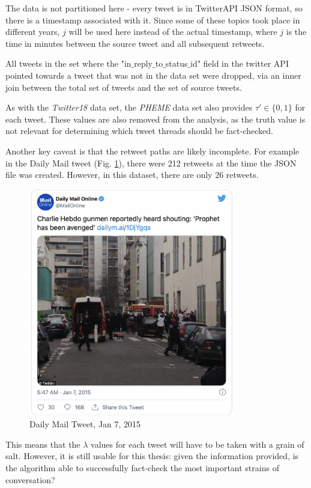 \documentclass[preprint,review,12pt]{elsarticle}
\begin{document}
The data is not partitioned here - every tweet is in TwitterAPI JSON format, so there is a timestamp associated with it. Since some of these topics took place in different years, $j$ will be used here instead of the actual timestamp, where $j$ is the time in minutes between the source tweet and all subsequent retweets.

All tweets in the set where the "in$\_$reply$\_$to$\_$status$\_$id" field in the twitter API pointed towards a tweet that was not in the data set were dropped, via an inner join between the total set of tweets and the set of source tweets. 

As with the \textit{Twitter18} data set, the \textit{PHEME} data set also provides $\tau' \in \{0,1\}$ for each tweet. These values are also removed from the analysis, as the truth value is not relevant for determining which tweet threads should be fact-checked.

Another key caveat is that the retweet paths are likely incomplete. For example in the Daily Mail tweet (Fig. \ref{fig:Daily Mail Tweet, Jan 7, 2015}), there were 212 retweets at the time the JSON file was created. However, in this dataset, there are only 26 retweets. 

 \begin{figure}[h!]
    \centering
    \includegraphics[width=9cm]{dailymail_charliehebdo.png}
    \caption{Daily Mail Tweet, Jan 7, 2015 \cite{dailymail2015tweet}}
    \label{fig:Daily Mail Tweet, Jan 7, 2015}
\end{figure}

This means that the $\lambda$ values for each tweet will have to be taken with a grain of salt. However, it is still usable for this thesis: given the information provided, is the algorithm able to successfully fact-check the most important strains of conversation? 
\end{document}
